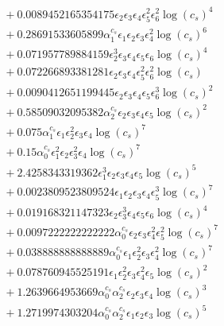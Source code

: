 \documentclass[10pt]{article}
\begin{document}
\begin{align*}
&{}  + 0.0089452165354175 \epsilon_{2} \epsilon_{3} \epsilon_{4} \epsilon_{5}^{2} \epsilon_{6}^{2} \log{\left(c_{s} \right)}^{4} \\
&{}  + 0.28691533605899 \alpha_{1}^{c_s} \epsilon_{1} \epsilon_{2} \epsilon_{3} \epsilon_{4}^{2} \log{\left(c_{s} \right)}^{6} \\
&{}  + 0.071957789884159 \epsilon_{2}^{3} \epsilon_{3} \epsilon_{4} \epsilon_{5} \epsilon_{6} \log{\left(c_{s} \right)}^{4} \\
&{}  + 0.072266893381281 \epsilon_{2} \epsilon_{3} \epsilon_{4} \epsilon_{5}^{2} \epsilon_{6}^{2} \log{\left(c_{s} \right)} \\
&{}  + 0.0090412651199445 \epsilon_{2} \epsilon_{3} \epsilon_{4} \epsilon_{5} \epsilon_{6}^{3} \log{\left(c_{s} \right)}^{2} \\
&{}  + 0.58509032095382 \alpha_{2}^{c_s} \epsilon_{2} \epsilon_{3} \epsilon_{4} \epsilon_{5} \log{\left(c_{s} \right)}^{2} \\
&{}  + 0.075 \alpha_{1}^{c_s} \epsilon_{1} \epsilon_{2}^{2} \epsilon_{3} \epsilon_{4} \log{\left(c_{s} \right)}^{7} \\
&{}  + 0.15 \alpha_{0}^{c_s} \epsilon_{1}^{2} \epsilon_{2} \epsilon_{3}^{2} \epsilon_{4} \log{\left(c_{s} \right)}^{7} \\
&{}  + 2.4258343319362 \epsilon_{1}^{3} \epsilon_{2} \epsilon_{3} \epsilon_{4} \epsilon_{5} \log{\left(c_{s} \right)}^{5} \\
&{}  + 0.0023809523809524 \epsilon_{1} \epsilon_{2} \epsilon_{3} \epsilon_{4} \epsilon_{5}^{3} \log{\left(c_{s} \right)}^{7} \\
&{}  + 0.019168321147323 \epsilon_{2} \epsilon_{3}^{3} \epsilon_{4} \epsilon_{5} \epsilon_{6} \log{\left(c_{s} \right)}^{4} \\
&{}  + 0.0097222222222222 \alpha_{0}^{c_s} \epsilon_{2} \epsilon_{3} \epsilon_{4}^{2} \epsilon_{5}^{2} \log{\left(c_{s} \right)}^{7} \\
&{}  + 0.038888888888889 \alpha_{0}^{c_s} \epsilon_{1} \epsilon_{2}^{2} \epsilon_{3} \epsilon_{4}^{2} \log{\left(c_{s} \right)}^{7} \\
&{}  + 0.078760945525191 \epsilon_{1} \epsilon_{2}^{2} \epsilon_{3} \epsilon_{4}^{2} \epsilon_{5} \log{\left(c_{s} \right)}^{2} \\
&{}  + 1.2639664953669 \alpha_{0}^{c_s} \alpha_{2}^{c_s} \epsilon_{2} \epsilon_{3} \epsilon_{4} \log{\left(c_{s} \right)}^{3} \\
&{}  + 1.2719974303204 \alpha_{0}^{c_s} \alpha_{2}^{c_s} \epsilon_{1} \epsilon_{2} \epsilon_{3} \log{\left(c_{s} \right)}^{5} \\

\end{align*}
\end{document}
